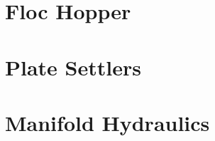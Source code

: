 \documentclass[letterpaper,10pt,english]{sphinxmanual}
\begin{document}
\section{Floc Hopper}
\label{\detokenize{Sedimentation/Sed_Intro:floc-hopper}}\label{\detokenize{Sedimentation/Sed_Intro:id3}}

\section{Plate Settlers}
\label{\detokenize{Sedimentation/Sed_Intro:plate-settlers}}\label{\detokenize{Sedimentation/Sed_Intro:id4}}

\section{Manifold Hydraulics}
\label{\detokenize{Sedimentation/Sed_Intro:manifold-hydraulics}}\label{\detokenize{Sedimentation/Sed_Intro:id5}}
\end{document}
